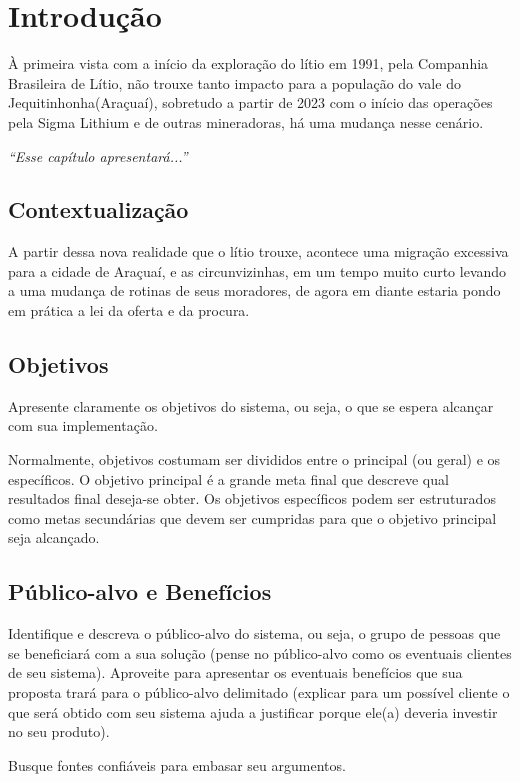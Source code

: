 \chapter{Introdução}


À primeira vista com a início da exploração do lítio em 1991, pela Companhia Brasileira de Lítio, não trouxe tanto impacto para a população do vale do Jequitinhonha(Araçuaí), sobretudo a partir de 2023 com o início das operações pela Sigma Lithium e de outras mineradoras, há uma mudança nesse cenário. 


\textit{``Esse capítulo apresentará...''}

\section{Contextualização}


 A partir dessa nova realidade que o lítio trouxe, acontece uma migração excessiva para a cidade de Araçuaí, e as circunvizinhas, em um tempo muito curto levando a uma mudança de rotinas de seus moradores, de agora em diante estaria pondo em prática a lei da oferta e da procura. 

\section{Objetivos}
Apresente claramente os objetivos do sistema, ou seja, o que se espera alcançar com sua implementação. 

Normalmente, objetivos costumam ser divididos entre o principal (ou geral) e os específicos. O objetivo principal é a grande meta final que descreve qual resultados final deseja-se obter. Os objetivos específicos podem ser estruturados como metas secundárias que devem ser cumpridas para que o objetivo principal seja alcançado.

\section{Público-alvo e Benefícios}
Identifique e descreva o público-alvo do sistema, ou seja, o grupo de pessoas que se beneficiará com a sua solução (pense no público-alvo como os eventuais clientes de seu sistema). Aproveite para apresentar os eventuais benefícios que sua proposta trará para o público-alvo delimitado (explicar para um possível cliente o que será obtido com seu sistema ajuda a justificar porque ele(a) deveria investir no seu produto).



Busque fontes confiáveis para embasar seu argumentos.